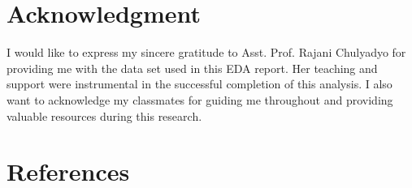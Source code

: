 \documentclass[journal]{IEEEtai}
\begin{document}
\section*{Acknowledgment}
I would like to express my sincere gratitude to Asst. Prof. Rajani Chulyadyo for providing me with the data set used in this EDA report. Her teaching and support were instrumental in the successful completion of this analysis. I also want to acknowledge my classmates for guiding me throughout and providing valuable resources during this research.















\section*{References}
\end{document}
